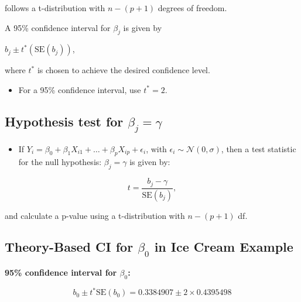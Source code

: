 \documentclass[]{book}
\newenvironment{Shaded}{\begin{snugshade}}{\end{snugshade}}
\newcommand{\KeywordTok}[1]{\textcolor[rgb]{0.13,0.29,0.53}{\textbf{#1}}}
\newcommand{\DecValTok}[1]{\textcolor[rgb]{0.00,0.00,0.81}{#1}}
\newcommand{\StringTok}[1]{\textcolor[rgb]{0.31,0.60,0.02}{#1}}
\newcommand{\OperatorTok}[1]{\textcolor[rgb]{0.81,0.36,0.00}{\textbf{#1}}}
\newcommand{\NormalTok}[1]{#1}
\providecommand{\tightlist}{%
  \setlength{\itemsep}{0pt}\setlength{\parskip}{0pt}}
\begin{document}
follows a t-distribution with \(n-(p+1)\) degrees of freedom.

A 95\% confidence interval for \(\beta_j\) is given by

\(b_j \pm t^*\left({\text{SE}(b_j)}\right)\),

where \(t^*\) is chosen to achieve the desired confidence level.

\begin{itemize}
\tightlist
\item
  For a 95\% confidence interval, use \(t^*=2\).
\end{itemize}

\subsection{\texorpdfstring{Hypothesis test for
\(\beta_j=\gamma\)}{Hypothesis test for \textbackslash{}beta\_j=\textbackslash{}gamma}}\label{hypothesis-test-for-beta_jgamma}

\begin{itemize}
\tightlist
\item
  If
  \(Y_i = \beta_0 + \beta_1X_{i1}+ \ldots + \beta_pX_{ip} + \epsilon_i\),
  with \(\epsilon_i\sim\mathcal{N}(0,\sigma)\), then a test statistic
  for the null hypothesis: \(\beta_j = \gamma\) is given by:
\end{itemize}

\[
t=\frac{{b_j}-\gamma}{\text{SE}(b_j)}, 
\]

and calculate a p-value using a t-distribution with \(n-(p+1)\) df.

\subsection{\texorpdfstring{Theory-Based CI for \(\beta_0\) in Ice Cream
Example}{Theory-Based CI for \textbackslash{}beta\_0 in Ice Cream Example}}\label{theory-based-ci-for-beta_0-in-ice-cream-example}

\textbf{95\% confidence interval for \(\beta_0\):}

\[
b_0\pm t^*\text{SE}(b_0) = 0.3384907 \pm 2 \times 0.4395498
\]

\begin{Shaded}
\end{Shaded}
\end{document}
